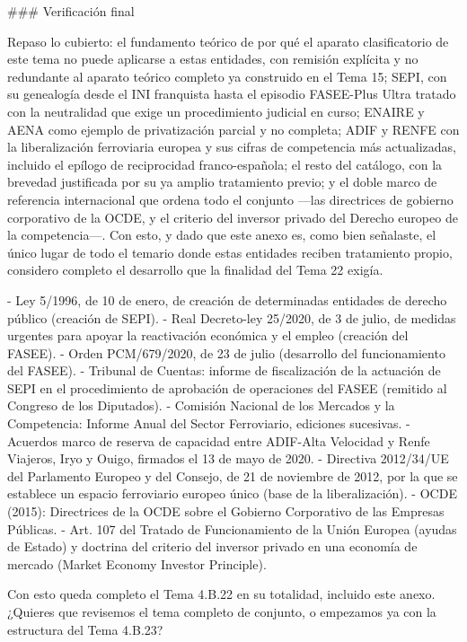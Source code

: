 \documentclass[10pt,a4paper]{article}
\newcounter{anexo}
\begin{document}
### Verificación final

Repaso lo cubierto: el fundamento teórico de por qué el aparato clasificatorio de este tema no puede aplicarse a estas entidades, con remisión explícita y no redundante al aparato teórico completo ya construido en el Tema 15; SEPI, con su genealogía desde el INI franquista hasta el episodio FASEE-Plus Ultra tratado con la neutralidad que exige un procedimiento judicial en curso; ENAIRE y AENA como ejemplo de privatización parcial y no completa; ADIF y RENFE con la liberalización ferroviaria europea y sus cifras de competencia más actualizadas, incluido el epílogo de reciprocidad franco-española; el resto del catálogo, con la brevedad justificada por su ya amplio tratamiento previo; y el doble marco de referencia internacional que ordena todo el conjunto —las directrices de gobierno corporativo de la OCDE, y el criterio del inversor privado del Derecho europeo de la competencia—. Con esto, y dado que este anexo es, como bien señalaste, el único lugar de todo el temario donde estas entidades reciben tratamiento propio, considero completo el desarrollo que la finalidad del Tema 22 exigía.



- Ley 5/1996, de 10 de enero, de creación de determinadas entidades de derecho público (creación de SEPI).
- Real Decreto-ley 25/2020, de 3 de julio, de medidas urgentes para apoyar la reactivación económica y el empleo (creación del FASEE).
- Orden PCM/679/2020, de 23 de julio (desarrollo del funcionamiento del FASEE).
- Tribunal de Cuentas: informe de fiscalización de la actuación de SEPI en el procedimiento de aprobación de operaciones del FASEE (remitido al Congreso de los Diputados).
- Comisión Nacional de los Mercados y la Competencia: Informe Anual del Sector Ferroviario, ediciones sucesivas.
- Acuerdos marco de reserva de capacidad entre ADIF-Alta Velocidad y Renfe Viajeros, Iryo y Ouigo, firmados el 13 de mayo de 2020.
- Directiva 2012/34/UE del Parlamento Europeo y del Consejo, de 21 de noviembre de 2012, por la que se establece un espacio ferroviario europeo único (base de la liberalización).
- OCDE (2015): Directrices de la OCDE sobre el Gobierno Corporativo de las Empresas Públicas.
- Art. 107 del Tratado de Funcionamiento de la Unión Europea (ayudas de Estado) y doctrina del criterio del inversor privado en una economía de mercado (Market Economy Investor Principle).

Con esto queda completo el Tema 4.B.22 en su totalidad, incluido este anexo. ¿Quieres que revisemos el tema completo de conjunto, o empezamos ya con la estructura del Tema 4.B.23?
\end{document}
